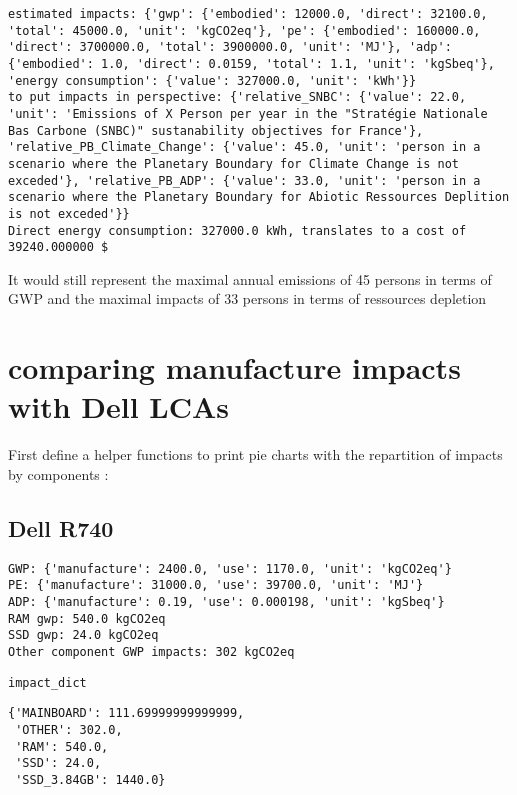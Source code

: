 \documentclass[11pt]{article}
\begin{document}
\begin{verbatim}
estimated impacts: {'gwp': {'embodied': 12000.0, 'direct': 32100.0, 'total': 45000.0, 'unit': 'kgCO2eq'}, 'pe': {'embodied': 160000.0, 'direct': 3700000.0, 'total': 3900000.0, 'unit': 'MJ'}, 'adp': {'embodied': 1.0, 'direct': 0.0159, 'total': 1.1, 'unit': 'kgSbeq'}, 'energy consumption': {'value': 327000.0, 'unit': 'kWh'}}
to put impacts in perspective: {'relative_SNBC': {'value': 22.0, 'unit': 'Emissions of X Person per year in the "Stratégie Nationale Bas Carbone (SNBC)" sustanability objectives for France'}, 'relative_PB_Climate_Change': {'value': 45.0, 'unit': 'person in a scenario where the Planetary Boundary for Climate Change is not exceded'}, 'relative_PB_ADP': {'value': 33.0, 'unit': 'person in a scenario where the Planetary Boundary for Abiotic Ressources Deplition is not exceded'}}
Direct energy consumption: 327000.0 kWh, translates to a cost of 39240.000000 $
\end{verbatim}


It would still represent the maximal annual emissions of 45 persons in
terms of GWP and the maximal impacts of 33 persons in terms of
ressources depletion




\section{comparing manufacture impacts with Dell LCAs}
\label{sec:orge0abcb4}
First define a helper functions to print pie charts with the
repartition of impacts by components : 

\subsection{Dell R740}
\label{sec:org16ff49a}
\begin{verbatim}
GWP: {'manufacture': 2400.0, 'use': 1170.0, 'unit': 'kgCO2eq'}
PE: {'manufacture': 31000.0, 'use': 39700.0, 'unit': 'MJ'}
ADP: {'manufacture': 0.19, 'use': 0.000198, 'unit': 'kgSbeq'}
RAM gwp: 540.0 kgCO2eq
SSD gwp: 24.0 kgCO2eq
Other component GWP impacts: 302 kgCO2eq
\end{verbatim}


\begin{verbatim}
impact_dict
\end{verbatim}

\begin{verbatim}
{'MAINBOARD': 111.69999999999999,
 'OTHER': 302.0,
 'RAM': 540.0,
 'SSD': 24.0,
 'SSD_3.84GB': 1440.0}
\end{verbatim}
\end{document}
